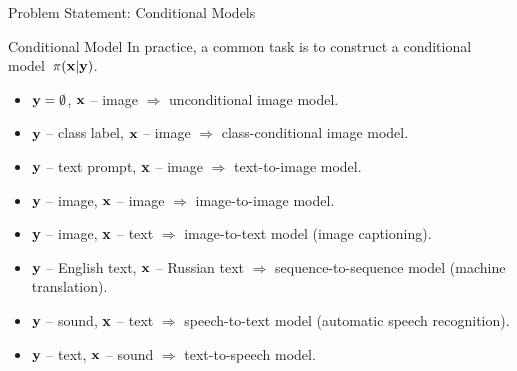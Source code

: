 \documentclass{beamer}
\begin{document}
\begin{frame}{Problem Statement: Conditional Models}
	\begin{block}{Conditional Model}
		In practice, a common task is to construct a conditional model~$\pi(\mathbf{x} | \mathbf{y})$. 
		\begin{itemize}
			\item $\mathbf{y} = \emptyset$, $\mathbf{x}$ -- image $\Rightarrow$ unconditional image model.
			\item $\mathbf{y}$ -- class label, $\mathbf{x}$ -- image $\Rightarrow$ class-conditional image model.
			\item $\mathbf{y}$ -- text prompt, $\mathbf{x}$ -- image $\Rightarrow$ text-to-image model.
			\item $\mathbf{y}$ -- image, $\mathbf{x}$ -- image $\Rightarrow$ image-to-image model.
			\item $\mathbf{y}$ -- image, $\mathbf{x}$ -- text $\Rightarrow$ image-to-text model (image captioning).
			\item $\mathbf{y}$ -- English text, $\mathbf{x}$ -- Russian text $\Rightarrow$ sequence-to-sequence model (machine translation).
			\item $\mathbf{y}$ -- sound, $\mathbf{x}$ -- text $\Rightarrow$ speech-to-text model (automatic speech recognition).
			\item $\mathbf{y}$ -- text, $\mathbf{x}$ -- sound $\Rightarrow$ text-to-speech model.
		\end{itemize}
	\end{block}
\end{frame}
\end{document}
